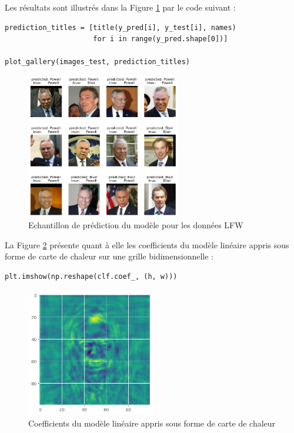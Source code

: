 \documentclass{article}
\begin{document}
\hspace{7pt} Les résultats sont illustrés dans la Figure \ref{fig:prediction} par le code suivant :

\begin{lstlisting}
prediction_titles = [title(y_pred[i], y_test[i], names)
                     for i in range(y_pred.shape[0])]

plot_gallery(images_test, prediction_titles)
\end{lstlisting}

\begin{figure}[H]
    \centering
    \includegraphics[width=0.6\textwidth]{../images/TB-CPpred.png}
    \caption{\centering Echantillon de prédiction du modèle pour les données LFW} 
    \label{fig:prediction}
\end{figure}

\hspace{7pt} La Figure \ref{fig:cc} présente quant à elle les coefficients du modèle linéaire appris sous forme de carte de chaleur sur une grille bidimensionnelle :

\begin{lstlisting}
plt.imshow(np.reshape(clf.coef_, (h, w)))
\end{lstlisting}

\begin{figure}[H]
    \centering
    \includegraphics[width=0.5\textwidth]{../images/cc.png}
    \caption{\centering Coefficients du modèle linéaire appris sous forme de carte de chaleur} 
    \label{fig:cc}
\end{figure}
\end{document}
